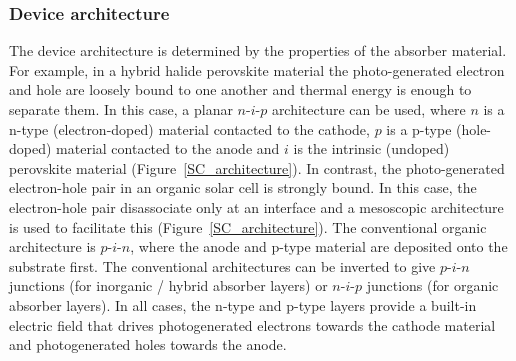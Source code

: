 \subsubsection{Device architecture}
The device architecture is determined by the properties of the absorber material. For example, in a hybrid halide perovskite material the photo-generated electron and hole are loosely bound to one another and thermal energy is enough to separate them. In this case, a planar $n$-$i$-$p$ architecture can be used, where $n$ is a n-type (electron-doped) material contacted to the cathode, $p$ is a p-type (hole-doped) material contacted to the anode and $i$ is the intrinsic (undoped) perovskite material (Figure\ \ref{SC_architecture}). In contrast, the photo-generated electron-hole pair in an organic solar cell is strongly bound. In this case, the electron-hole pair disassociate only at an interface and a mesoscopic architecture is used to facilitate this (Figure\ \ref{SC_architecture}). The conventional organic architecture is $p$-$i$-$n$, where the anode and p-type material are deposited onto the substrate first. The conventional architectures can be inverted to give $p$-$i$-$n$ junctions (for inorganic / hybrid absorber layers) or $n$-$i$-$p$ junctions (for organic absorber layers). In all cases, the n-type and p-type layers provide a built-in electric field that drives photogenerated electrons towards the cathode material and photogenerated holes towards the anode.

